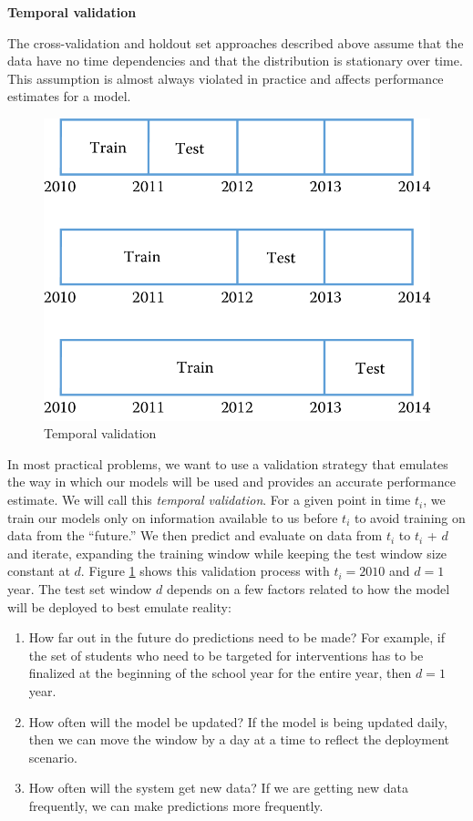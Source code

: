 \documentclass[]{krantz}
\begin{document}
\textbf{Temporal validation}

The cross-validation and holdout set approaches described above assume
that the data have no time dependencies and that the distribution is
stationary over time. This assumption is almost always violated in
practice and affects performance estimates for a model.

\begin{figure}

{\centering \includegraphics[width=0.7\linewidth]{ChapterML/figures/temporal} 

}

\caption{Temporal validation}\label{fig:temporal}
\end{figure}

In most practical problems, we want to use a validation strategy that
emulates the way in which our models will be used and provides an
accurate performance estimate. We will call this \emph{temporal
validation}. For a given point in time \(t_i\), we train our models only
on information available to us before \(t_i\) to avoid training on data
from the ``future.'' We then predict and evaluate on data from \(t_i\)
to \(t_i\) + \(d\) and iterate, expanding the training window while
keeping the test window size constant at \(d\). Figure
\ref{fig:temporal} shows this validation process with \(t_i=2010\) and
\(d=1\) year. The test set window \(d\) depends on a few factors related
to how the model will be deployed to best emulate reality:

\begin{enumerate}
\def\labelenumi{\arabic{enumi}.}
\item
  How far out in the future do predictions need to be made? For example,
  if the set of students who need to be targeted for interventions has
  to be finalized at the beginning of the school year for the entire
  year, then \(d = 1\) year.
\item
  How often will the model be updated? If the model is being updated
  daily, then we can move the window by a day at a time to reflect the
  deployment scenario.
\item
  How often will the system get new data? If we are getting new data
  frequently, we can make predictions more frequently.
\end{enumerate}
\end{document}
